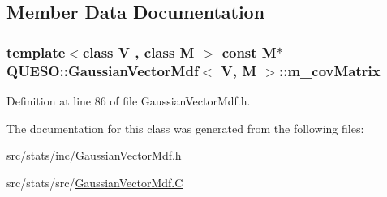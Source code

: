 \subsection{Member Data Documentation}
\hypertarget{class_q_u_e_s_o_1_1_gaussian_vector_mdf_ad87107b4a431d4bb7b8a2c1409b71e14}{
\subsubsection[{m\-\_\-cov\-Matrix}]{\setlength{\rightskip}{0pt plus 5cm}template$<$class V , class M $>$ const M$\ast$ {\bf Q\-U\-E\-S\-O\-::\-Gaussian\-Vector\-Mdf}$<$ V, M $>$\-::m\-\_\-cov\-Matrix\hspace{0.3cm}{\ttfamily [protected]}}}\label{class_q_u_e_s_o_1_1_gaussian_vector_mdf_ad87107b4a431d4bb7b8a2c1409b71e14}


Definition at line 86 of file Gaussian\-Vector\-Mdf.\-h.



The documentation for this class was generated from the following files\-:\begin{DoxyCompactItemize}
\item 
src/stats/inc/\hyperlink{_gaussian_vector_mdf_8h}{Gaussian\-Vector\-Mdf.\-h}\item 
src/stats/src/\hyperlink{_gaussian_vector_mdf_8_c}{Gaussian\-Vector\-Mdf.\-C}\end{DoxyCompactItemize}
